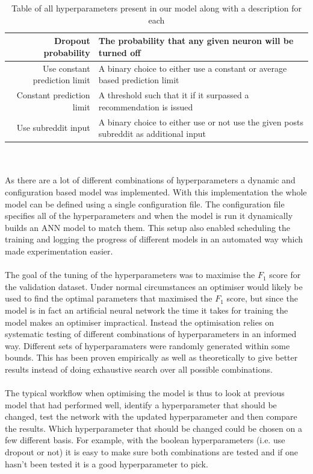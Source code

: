 \begin{table}[h!]
\begin{tabular}{ r  p{7cm} }
        Dropout probability & The probability that any given neuron will be turned off \\ \hline
        Use constant prediction limit & A binary choice to either use a constant or average based prediction limit \\ \hline
        Constant prediction limit & A threshold such that it if it surpassed a recommendation is issued  \\ \hline
        Use subreddit input & A binary choice to either use or not use the given posts subreddit as additional input \\ \hline
    \end{tabular}
    \caption{Table of all hyperparameters present in our model along with a description for each}
    \label{table:hyperparameters}
\end{table}
\\\\
As there are a lot of different combinations of hyperparameters a dynamic and configuration based model was implemented. With this implementation the whole model can be defined using a single configuration file. The configuration file specifies all of the hyperparameters and when the model is run it dynamically builds an ANN model to match them. This setup also enabled scheduling the training and logging the progress of different models in an automated way which made experimentation easier.
\\\\
The goal of the tuning of the hyperparameters was to maximise the $F_1$ score for the validation dataset. Under normal circumstances an optimiser would likely be used to find the optimal parameters that maximised the $F_1$ score, but since the model is in fact an artificial neural network the time it takes for training the model makes an optimiser impractical. Instead the optimisation relies on systematic testing of different combinations of hyperparameters in an informed way. Different sets of hyperparamaters were randomly generated within some bounds. This has been proven empirically as well as theoretically to give better results instead of doing exhaustive search over all possible combinations. \parencite{bergstra2012random}
\\\\
The typical workflow when optimising the model is thus to look at previous model that had performed well, identify a hyperparameter that should be changed, test the network with the updated hyperparameter and then compare the results. Which hyperparameter that should be changed could be chosen on a few different basis. For example, with the boolean hyperparameters (i.e. use dropout or not) it is easy to make sure both combinations are tested and if one hasn't been tested it is a good hyperparameter to pick.
